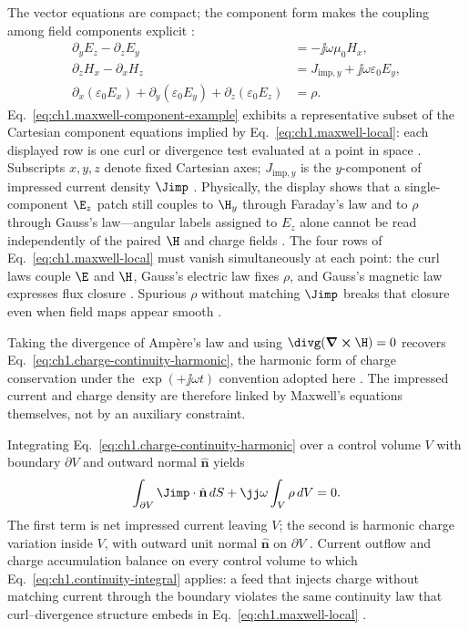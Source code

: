 The vector equations are compact; the component form makes the coupling among field components explicit \cite{stratton1941}:
\begin{equation}
\label{eq:ch1.maxwell-component-example}
\begin{aligned}
\partial_y E_z-\partial_z E_y&=-\jj\omega\mu_0 H_x,\\
\partial_z H_x-\partial_x H_z&=J_{\mathrm{imp},y}+\jj\omega\varepsilon_0 E_y,\\
\partial_x(\varepsilon_0 E_x)+\partial_y(\varepsilon_0 E_y)+\partial_z(\varepsilon_0 E_z)&=\rho.
\end{aligned}
\end{equation}
Eq.~\eqref{eq:ch1.maxwell-component-example} exhibits a representative subset of the Cartesian component equations implied by Eq.~\eqref{eq:ch1.maxwell-local}: each displayed row is one curl or divergence test evaluated at a point in space \cite{stratton1941}. Subscripts $x,y,z$ denote fixed Cartesian axes; $J_{\mathrm{imp},y}$ is the $y$-component of impressed current density $\Jimp$ \cite{harrington2001}. Physically, the display shows that a single-component $\E_z$ patch still couples to $\H_y$ through Faraday's law and to $\rho$ through Gauss's law---angular labels assigned to $E_z$ alone cannot be read independently of the paired $\H$ and charge fields \cite{maxwell1873}.
The four rows of Eq.~\eqref{eq:ch1.maxwell-local} must vanish simultaneously at each point: the curl laws couple \(\E\) and \(\H\), Gauss's electric law fixes \(\rho\), and Gauss's magnetic law expresses flux closure \cite{maxwell1873,stratton1941}. Spurious \(\rho\) without matching \(\Jimp\) breaks that closure even when field maps appear smooth \cite{hansen1988}.

Taking the divergence of Amp\`ere's law and using \(\divg(\curl\H)=0\) recovers Eq.~\eqref{eq:ch1.charge-continuity-harmonic}, the harmonic form of charge conservation under the \(\exp(+\jj\omega t)\) convention adopted here \cite{maxwell1873,stratton1941}. The impressed current and charge density are therefore linked by Maxwell's equations themselves, not by an auxiliary constraint.

Integrating Eq.~\eqref{eq:ch1.charge-continuity-harmonic} over a control volume
\(V\) with boundary \(\partial V\) and outward normal \(\hat{\mathbf{n}}\) yields
\begin{equation}
\label{eq:ch1.continuity-integral}
\int_{\partial V}\Jimp\cdot\hat{\mathbf{n}}\,dS
+\jj\omega\int_V\rho\,dV=0.
\end{equation}
The first term is net impressed current leaving \(V\); the second is harmonic charge variation inside \(V\), with outward unit normal \(\hat{\mathbf{n}}\) on \(\partial V\) \cite{maxwell1873}. Current outflow and charge accumulation balance on every control volume to which Eq.~\eqref{eq:ch1.continuity-integral} applies: a feed that injects charge without matching current through the boundary violates the same continuity law that curl--divergence structure embeds in Eq.~\eqref{eq:ch1.maxwell-local} \cite{stratton1941}.

